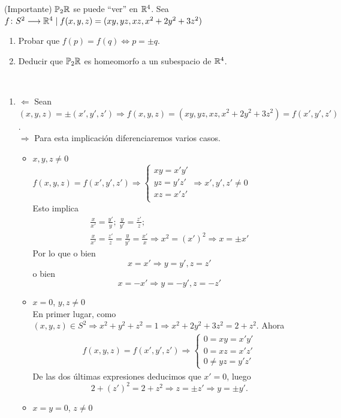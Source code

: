 \documentclass[GTS.tex]{subfiles}
\begin{document}
\begin{ejer}(Importante) $\mathbb{P}_2\mathbb{R}$ se puede ``ver'' en  $\mathbb{R}^4$. Sea $f\colon{S^2}\longrightarrow{\mathbb{R}^4}\mid f(x,y,z)=(xy,yz,xz,x^2 +2y^2 +3z^2)$
\begin{enumerate}
\item Probar que $f(p)=f(q)\Leftrightarrow p=\pm q$.
\item Deducir que $\mathbb{P}_2\mathbb{R}$ es homeomorfo a un subespacio de $\mathbb{R}^4$.
\end{enumerate}
\begin{solucion}\
\begin{enumerate}
\item $\boxed{\Leftarrow}$ Sean $(x,y,z)=\pm(x',y',z')\Rightarrow f(x,y,z)=(xy,yz,xz,x^2 +2y^2 +3z^2)=f(x',y',z')$.\\
$\boxed{\Rightarrow}$ Para esta implicación diferenciaremos varios casos.
\begin{itemize}
\item $x,y,z\neq 0$\\
$f(x,y,z)=f(x',y',z')\Rightarrow\left\{\begin{array}{c}
xy=x'y'\\
yz=y'z'\\
xz=x'z'\\
\end{array}\right.\Rightarrow x',y',z'\neq 0$\\
Esto implica
\begin{gather*}
\frac{x}{x'}=\frac{y'}{y};\ \frac{y}{y'}=\frac{z'}{z};\\
\frac{x}{x'}=\frac{z'}{z}=\frac{y}{y'}=\frac{x'}{x}\Rightarrow x^2=(x')^2\Rightarrow x=\pm x'
\end{gather*}
Por lo que o bien
\[
x=x'\Rightarrow y=y',z=z'
\]
o bien
\[
x=-x'\Rightarrow y=-y',z=-z'
\]
\item $x=0$, $y,z\neq 0$\\
En primer lugar, como $(x,y,z)\in S^2\Rightarrow x^2+y^2+z^2=1\Rightarrow x^2+2y^2+3z^2=2+z^2$. Ahora
\begin{gather*}
f(x,y,z)=f(x',y',z')\Rightarrow\left\{\begin{array}{c}
0=xy=x'y'\\
0=xz=x'z'\\
0\neq yz=y'z'
\end{array}\right.
\end{gather*}
De las dos últimas expresiones deducimos que $x'=0$, luego
\[
2+(z')^2=2+z^2\Rightarrow z=\pm z'\Rightarrow y=\pm y'.
\]
\item $x=y=0$, $z\neq 0$\\

\end{itemize}
\end{enumerate}
\end{solucion}
\end{ejer}
\end{document}
